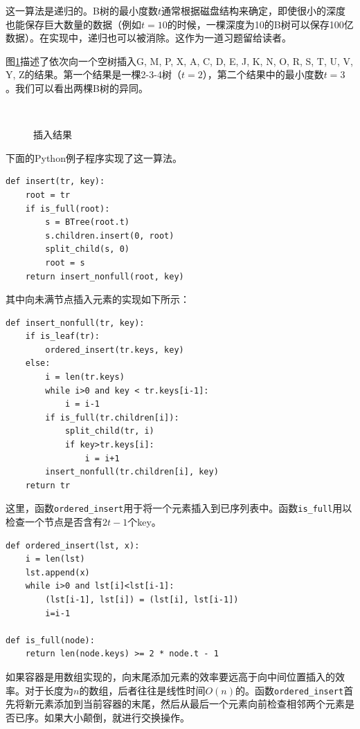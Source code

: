 \documentclass{ctexart}
\begin{document}
这一算法是递归的。B树的最小度数$t$通常根据磁盘结构来确定，即使很小的深度也能保存巨大数量的数据（例如$t=10$的时候，一棵深度为10的B树可以保存100亿数据）。在实现中，递归也可以被消除。这作为一道习题留给读者。

图\ref{fig:btree-insert}描述了依次向一个空树插入G, M, P, X, A, C, D, E, J, K, N, O, R, S, T, U, V, Y, Z的结果。第一个结果是一棵2-3-4树（$t=2$），第二个结果中的最小度数$t=3$。我们可以看出两棵B树的异同。

\begin{figure}[htbp]
  \centering
  \\
  \caption{插入结果} \label{fig:btree-insert}
\end{figure}

下面的Python例子程序实现了这一算法。

\lstset{language=Python}
\begin{lstlisting}
def insert(tr, key):
    root = tr
    if is_full(root):
        s = BTree(root.t)
        s.children.insert(0, root)
        split_child(s, 0)
        root = s
    return insert_nonfull(root, key)
\end{lstlisting}

其中向未满节点插入元素的实现如下所示：

\begin{lstlisting}
def insert_nonfull(tr, key):
    if is_leaf(tr):
        ordered_insert(tr.keys, key)
    else:
        i = len(tr.keys)
        while i>0 and key < tr.keys[i-1]:
            i = i-1
        if is_full(tr.children[i]):
            split_child(tr, i)
            if key>tr.keys[i]:
                i = i+1
        insert_nonfull(tr.children[i], key)
    return tr
\end{lstlisting}

这里，函数\texttt{ordered\_insert}用于将一个元素插入到已序列表中。函数\texttt{is\_full}用以检查一个节点是否含有$2t-1$个key。

\begin{lstlisting}
def ordered_insert(lst, x):
    i = len(lst)
    lst.append(x)
    while i>0 and lst[i]<lst[i-1]:
        (lst[i-1], lst[i]) = (lst[i], lst[i-1])
        i=i-1

def is_full(node):
    return len(node.keys) >= 2 * node.t - 1
\end{lstlisting}

如果容器是用数组实现的，向末尾添加元素的效率要远高于向中间位置插入的效率。对于长度为$n$的数组，后者往往是线性时间$O(n)$的。函数\texttt{ordered\_insert}首先将新元素添加到当前容器的末尾，然后从最后一个元素向前检查相邻两个元素是否已序。如果大小颠倒，就进行交换操作。
\end{document}
